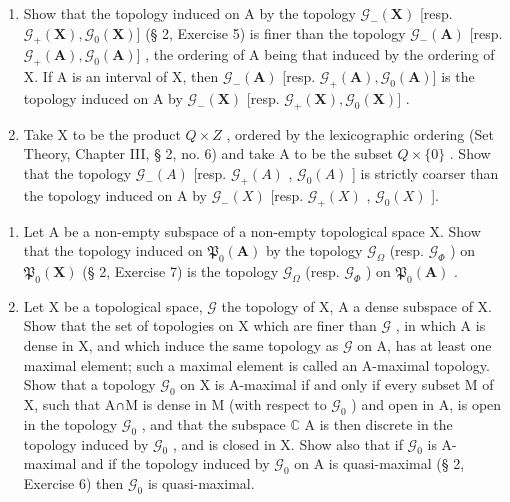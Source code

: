\begin{enumerate}
\def\labelenumi{\alph{enumi})}
\item
  Show that the topology induced on A by the topology \(\mathcal{G}_{-}(\mathbf{X})\) {[}resp. \(\mathcal{G}_{+}(\mathbf{X}),\mathcal{G}_{0}(\mathbf{X})]\) (§ 2, Exercise 5) is finer than the topology \(\mathcal{G}_{-}(\mathbf{A})\) {[}resp. \(\mathcal{G}_{+}(\mathbf{A}),\mathcal{G}_{0}(\mathbf{A})]\) , the ordering of A being that induced by the ordering of X. If A is an interval of X, then \(\mathcal{G}_{-}(\mathbf{A})\) {[}resp. \(\mathcal{G}_{+}(\mathbf{A}),\mathcal{G}_{0}(\mathbf{A})]\) is the topology induced on A by \(\mathcal{G}_{-}(\mathbf{X})\) {[}resp. \(\mathcal{G}_{+}(\mathbf{X}),\mathcal{G}_{0}(\mathbf{X})]\) .
\item
  Take X to be the product \(Q \times Z\) , ordered by the lexicographic ordering (Set Theory, Chapter III, § 2, no. 6) and take A to be the subset \(Q \times \{0\}\) . Show that the topology \(\mathcal{G}_{-}(A)\) {[}resp. \(\mathcal{G}_{+}(A)\) , \(\mathcal{G}_{0}(A)\) {]} is strictly coarser than the topology induced on A by \(\mathcal{G}_{-}(X)\) {[}resp. \(\mathcal{G}_{+}(X)\) , \(\mathcal{G}_{0}(X)\) {]}.
\end{enumerate}

\begin{enumerate}
\def\labelenumi{\arabic{enumi})}
\setcounter{enumi}{9}
\item
  Let A be a non-empty subspace of a non-empty topological space X. Show that the topology induced on \(\mathfrak{P}_{0}(\mathbf{A})\) by the topology \(\mathcal{G}_{\Omega}\) (resp. \(\mathcal{G}_{\Phi}\) ) on \(\mathfrak{P}_{0}(\mathbf{X})\) (§ 2, Exercise 7) is the topology \(\mathcal{G}_{\Omega}\) (resp. \(\mathcal{G}_{\Phi}\) ) on \(\mathfrak{P}_{0}(\mathbf{A})\) .
\item
  Let X be a topological space, \(\mathcal{G}\) the topology of X, A a dense subspace of X. Show that the set of topologies on X which are finer than \(\mathcal{G}\) , in which A is dense in X, and which induce the same topology as \(\mathcal{G}\) on A, has at least one maximal element; such a maximal element is called an A-maximal topology. Show that a topology \(\mathcal{G}_0\) on X is A-maximal if and only if every subset M of X, such that A∩M is dense in M (with respect to \(\mathcal{G}_0\) ) and open in A, is open in the topology \(\mathcal{G}_0\) , and that the subspace \(\mathbb{C}\) A is then discrete in the topology induced by \(\mathcal{G}_0\) , and is closed in X. Show also that if \(\mathcal{G}_0\) is A-maximal and if the topology induced by \(\mathcal{G}_0\) on A is quasi-maximal (§ 2, Exercise 6) then \(\mathcal{G}_0\) is quasi-maximal.
\end{enumerate}

